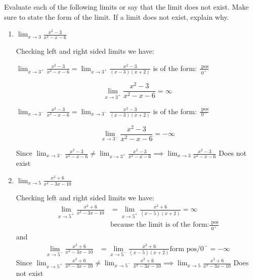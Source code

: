 \documentclass[nooutcomes, handout]{ximera}
\begin{document}
\begin{problem}
  Evaluate each of the following limits or say that the limit does not exist. Make sure to state the form of the limit.
  If a limit does not exist, explain why.

  \begin{enumerate}
	\item
      $\displaystyle \lim_{x \to 3} \frac{x^2 - 3}{x^2 - x - 6}$
      \begin{freeResponse} Checking left and right sided limits we have:

          $\lim_{x \to 3^+} \frac{x^2 - 3}{x^2 - x - 6} = \lim_{x \to 3^+} \frac{x^2 - 3}{(x-3)(x+2)}$ is of the form:  $\frac{\text{ pos}}{0^+}$

	$$\lim_{x \to 3^+} \frac{x^2 - 3}{x^2 - x - 6} = \infty$$

         $ \lim_{x \to 3^-} \frac{x^2 - 3}{x^2 - x - 6} = \lim_{x \to 3^-} \frac{x^2 - 3}{(x-3)(x+2)}$  is of the form:  $\frac{\text{ pos}}{0^-}$

	$$\lim_{x \to 3^-} \frac{x^2 - 3}{x^2 - x - 6} =-\infty$$

	Since $\lim_{x \to 3^-} \frac{x^2 - 3}{x^2 - x - 6} \ne \lim_{x \to 3^+} \frac{x^2 - 3}{x^2 - x - 6}\implies \lim_{x \to 3} \frac{x^2 - 3}{x^2 - x - 6}$ Does not exist
      \end{freeResponse}

    \item
      $\displaystyle \lim_{x \to 5} \frac{x^2 + 6}{x^2 - 3x - 10}$
      \begin{freeResponse}
       Checking left and right sided limits we have:
        \begin{align*}
          \lim_{x \to 5^+} \frac{x^2 + 6}{x^2 - 3x - 10} &= \lim_{x \to 5^+} \frac{x^2 + 6}{(x-5)(x+2)}  = \infty \\
	&\text{because the limit is of the form:} \frac{\text{ pos}}{0^+}
        \end{align*}
        and
        \begin{align*}
          \lim_{x \to 5^-} \frac{x^2 + 6}{x^2 - 3x - 10} &= \lim_{x \to 5^-} \frac{x^2 + 6}{(x-5)(x+2)} \text{form $\text{pos}/0^-$} = -\infty
        \end{align*}
Since $ \lim_{x \to 5^+} \frac{x^2 + 6}{x^2 - 3x - 10}  \ne \lim_{x \to 5^-} \frac{x^2 + 6}{x^2 - 3x - 10}\implies \lim_{x \to 5} \frac{x^2 + 6}{x^2 - 3x - 10}$ Does not exist
      \end{freeResponse}


\end{enumerate}
\end{problem}
\end{document}
